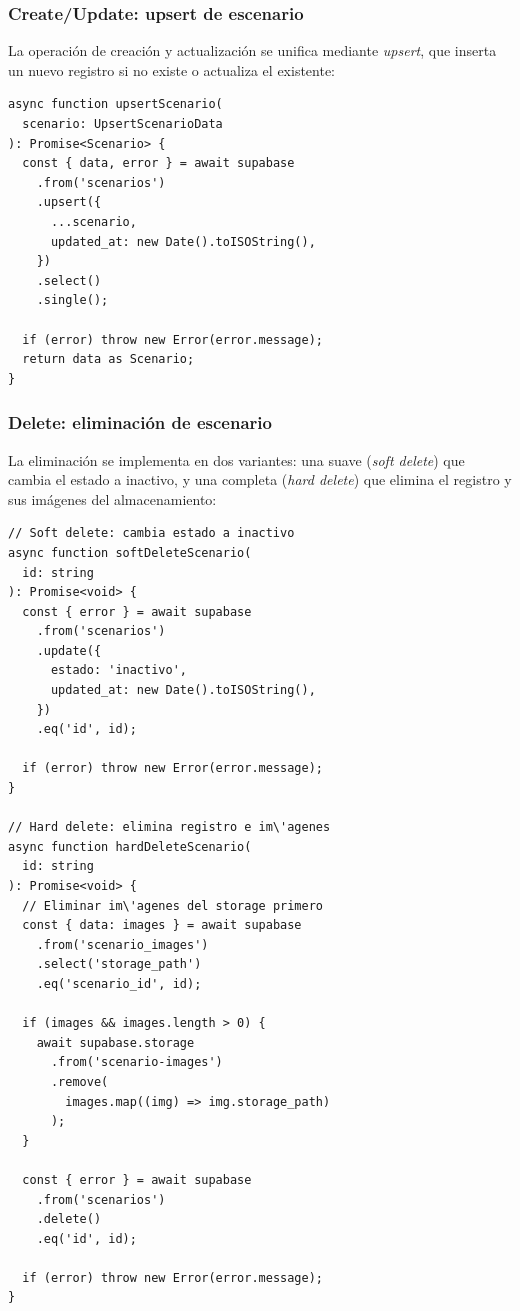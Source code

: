 \subsubsection{Create/Update: upsert de escenario}

La operaci\'on de creaci\'on y actualizaci\'on se unifica mediante
\textit{upsert}, que inserta un nuevo registro si no existe o
actualiza el existente:

\begin{lstlisting}
async function upsertScenario(
  scenario: UpsertScenarioData
): Promise<Scenario> {
  const { data, error } = await supabase
    .from('scenarios')
    .upsert({
      ...scenario,
      updated_at: new Date().toISOString(),
    })
    .select()
    .single();

  if (error) throw new Error(error.message);
  return data as Scenario;
}
\end{lstlisting}

\subsubsection{Delete: eliminaci\'on de escenario}

La eliminaci\'on se implementa en dos variantes: una suave
(\textit{soft delete}) que cambia el estado a inactivo, y una
completa (\textit{hard delete}) que elimina el registro y sus
im\'agenes del almacenamiento:

\begin{lstlisting}
// Soft delete: cambia estado a inactivo
async function softDeleteScenario(
  id: string
): Promise<void> {
  const { error } = await supabase
    .from('scenarios')
    .update({
      estado: 'inactivo',
      updated_at: new Date().toISOString(),
    })
    .eq('id', id);

  if (error) throw new Error(error.message);
}

// Hard delete: elimina registro e im\'agenes
async function hardDeleteScenario(
  id: string
): Promise<void> {
  // Eliminar im\'agenes del storage primero
  const { data: images } = await supabase
    .from('scenario_images')
    .select('storage_path')
    .eq('scenario_id', id);

  if (images && images.length > 0) {
    await supabase.storage
      .from('scenario-images')
      .remove(
        images.map((img) => img.storage_path)
      );
  }

  const { error } = await supabase
    .from('scenarios')
    .delete()
    .eq('id', id);

  if (error) throw new Error(error.message);
}
\end{lstlisting}

